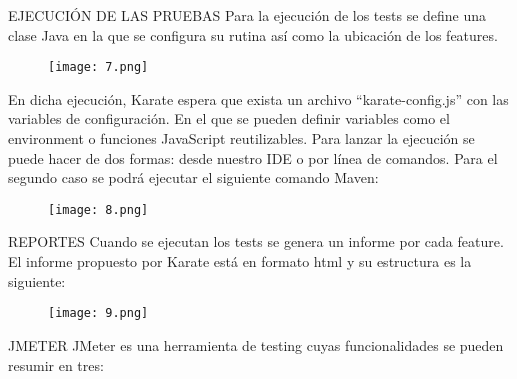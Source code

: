 \documentclass{article}
\begin{document}
\newline
\endline
\newline
\newline
EJECUCIÓN DE LAS PRUEBAS
\newline
\newline
Para la ejecución de los tests se define una clase Java en la que se configura su rutina así como la ubicación de los features.
\begin{figure}[H]
\centering
\texttt{[image: 7.png]}
\caption{\label{fig:1}}
\end{figure}
\newline
\newline
En dicha ejecución, Karate espera que exista un archivo “karate-config.js” con las variables de configuración. En el que se pueden definir variables como el environment o funciones JavaScript reutilizables.
\newline
\newline
Para lanzar la ejecución se puede hacer de dos formas: desde nuestro IDE o por línea de comandos. Para el segundo caso se podrá ejecutar el siguiente comando Maven:
\newline
\newline
\begin{figure}[H]
\centering
\texttt{[image: 8.png]}
\caption{\label{fig:1}}
\end{figure}
\newline
\newline
REPORTES
\newline
\newline
Cuando se ejecutan los tests se genera un informe por cada feature. El informe propuesto por Karate está en formato html y su estructura es la siguiente:
\newline
\newline
\begin{figure}[H]
\centering
\texttt{[image: 9.png]}
\caption{\label{fig:1}}
\end{figure}



JMETER
\newline 
\newline
JMeter es una herramienta de testing cuyas funcionalidades se pueden resumir en tres:
\end{document}

